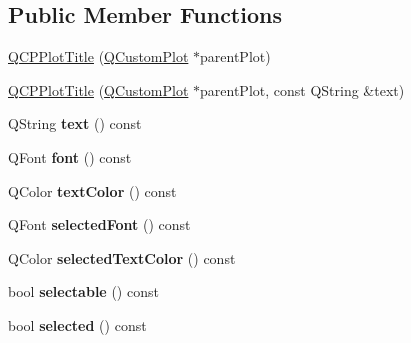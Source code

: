 \subsection*{\-Public \-Member \-Functions}
\begin{DoxyCompactItemize}
\item 
\hyperlink{classQCPPlotTitle_aaae17bee2de6d6a1e695f76fb1abed03}{\-Q\-C\-P\-Plot\-Title} (\hyperlink{classQCustomPlot}{\-Q\-Custom\-Plot} $\ast$parent\-Plot)
\item 
\hyperlink{classQCPPlotTitle_a90b9f46ceccbeee41f71c895a8c7ee1f}{\-Q\-C\-P\-Plot\-Title} (\hyperlink{classQCustomPlot}{\-Q\-Custom\-Plot} $\ast$parent\-Plot, const \-Q\-String \&text)
\item 
\hypertarget{classQCPPlotTitle_aeaa6f2384a611e8a610262b976b3cee5}{\-Q\-String {\bfseries text} () const }\label{classQCPPlotTitle_aeaa6f2384a611e8a610262b976b3cee5}

\item 
\hypertarget{classQCPPlotTitle_aa5f4cf007db51ccdd1c137191f564119}{\-Q\-Font {\bfseries font} () const }\label{classQCPPlotTitle_aa5f4cf007db51ccdd1c137191f564119}

\item 
\hypertarget{classQCPPlotTitle_a69f2cae768ff84dbf9f8a387ad617781}{\-Q\-Color {\bfseries text\-Color} () const }\label{classQCPPlotTitle_a69f2cae768ff84dbf9f8a387ad617781}

\item 
\hypertarget{classQCPPlotTitle_aa865a3656e01ee8db41837afa892f2a3}{\-Q\-Font {\bfseries selected\-Font} () const }\label{classQCPPlotTitle_aa865a3656e01ee8db41837afa892f2a3}

\item 
\hypertarget{classQCPPlotTitle_ab2262e40edfc41540c1dbc1c4234f9d2}{\-Q\-Color {\bfseries selected\-Text\-Color} () const }\label{classQCPPlotTitle_ab2262e40edfc41540c1dbc1c4234f9d2}

\item 
\hypertarget{classQCPPlotTitle_a8d75c7cbcf2049c9512a3335d6f11416}{bool {\bfseries selectable} () const }\label{classQCPPlotTitle_a8d75c7cbcf2049c9512a3335d6f11416}

\item 
\hypertarget{classQCPPlotTitle_a9771f3a4bca026484d7c8b5d953b5e82}{bool {\bfseries selected} () const }\label{classQCPPlotTitle_a9771f3a4bca026484d7c8b5d953b5e82}


\end{DoxyCompactItemize}
